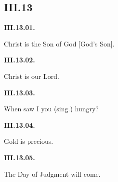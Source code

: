 \subsection*{III.13}

\par\begin{minipage}{\linewidth}\raggedright
\textbf{III.13.01.}

Christ is the Son of God [God’s Son].

\end{minipage}\par\addvspace{4pt}

\par\begin{minipage}{\linewidth}\raggedright
\textbf{III.13.02.}

Christ is our Lord.

\end{minipage}\par\addvspace{4pt}

\par\begin{minipage}{\linewidth}\raggedright
\textbf{III.13.03.}

When saw I you (sing.) hungry?

\end{minipage}\par\addvspace{4pt}

\par\begin{minipage}{\linewidth}\raggedright
\textbf{III.13.04.}

Gold is precious.

\end{minipage}\par\addvspace{4pt}

\par\begin{minipage}{\linewidth}\raggedright
\textbf{III.13.05.}

The Day of Judgment will come.

\end{minipage}\par\addvspace{4pt}

